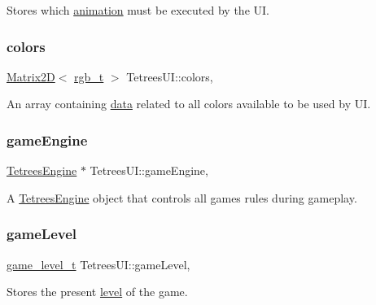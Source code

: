 Stores which \hyperlink{TetreesDefs_8hpp_a10487f3bfa31fd7b7b8c20f403f8c947}{animation} must be executed by the UI. \mbox{\label{classTetreesUI_a57300c1925cb5ae34c9220cd993e28b2}} 
\subsubsection{\texorpdfstring{colors}{colors}}
{\footnotesize\ttfamily \hyperlink{classMatrix2D}{Matrix2D}$<$ \hyperlink{structrgb__t}{rgb\+\_\+t} $>$ Tetrees\+U\+I\+::colors\hspace{0.3cm}{\ttfamily [static]}, {\ttfamily [private]}}

An array containing \hyperlink{structrgb__t}{data} related to all colors available to be used by UI. \mbox{\label{classTetreesUI_a07faa56ea40b28beba7509fa7f65c897}} 
\subsubsection{\texorpdfstring{game\+Engine}{gameEngine}}
{\footnotesize\ttfamily \hyperlink{classTetreesEngine}{Tetrees\+Engine} $\ast$ Tetrees\+U\+I\+::game\+Engine\hspace{0.3cm}{\ttfamily [static]}, {\ttfamily [private]}}

A \hyperlink{classTetreesEngine}{Tetrees\+Engine} object that controls all game\textquotesingle{}s rules during gameplay. \mbox{\label{classTetreesUI_a700b75dbee9c324c69a18f34c5efdab9}} 
\subsubsection{\texorpdfstring{game\+Level}{gameLevel}}
{\footnotesize\ttfamily \hyperlink{structgame__level__t}{game\+\_\+level\+\_\+t} Tetrees\+U\+I\+::game\+Level\hspace{0.3cm}{\ttfamily [static]}, {\ttfamily [private]}}

Stores the present \hyperlink{structgame__level__t}{level} of the game. \mbox{\label{classTetreesUI_a604cf4cecdbc93745eaf7733b3c33602}} 
